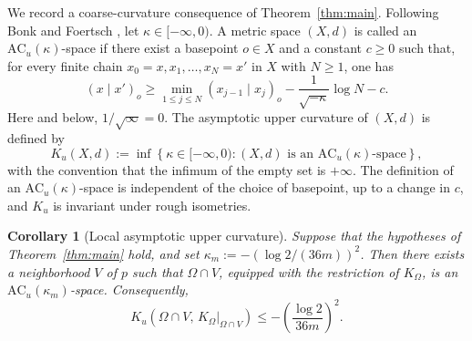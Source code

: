 \documentclass[11pt]{article}
\newtheorem{corollary}[theorem]{Corollary}
\theoremstyle{definition}
\begin{document}
We record a coarse-curvature consequence of
Theorem~\ref{thm:main}.  Following Bonk and Foertsch
\cite{BonkFoertsch}, let \(\kappa\in[-\infty,0)\).  A metric space
\((X,d)\) is called an \(\mathrm{AC}_u(\kappa)\)-space if there exist
a basepoint \(o\in X\) and a constant \(c\ge0\) such that, for every
finite chain \(x_0=x,x_1,\ldots,x_N=x'\) in \(X\) with \(N\ge1\), one has
\begin{equation}\label{eq:acu-chain-condition}
	(x\mid x')_o
	\ge
	\min_{1\le j\le N}(x_{j-1}\mid x_j)_o
	-
	\frac{1}{\sqrt{-\kappa}}\log N
	-c.
\end{equation}
Here and below, \(1/\sqrt{\infty}=0\).  The asymptotic upper curvature
of \((X,d)\) is defined by
\[
K_u(X,d)
:=
\inf\left\{
\kappa\in[-\infty,0):
(X,d)\text{ is an }\mathrm{AC}_u(\kappa)\text{-space}
\right\},
\]
with the convention that the infimum of the empty set is \(+\infty\).
The definition of an \(\mathrm{AC}_u(\kappa)\)-space is independent of
the choice of basepoint, up to a change in \(c\), and \(K_u\) is
invariant under rough isometries.

\begin{corollary}[Local asymptotic upper curvature]
	\label{cor:local-asymptotic-curvature}
	Suppose that the hypotheses of Theorem~\ref{thm:main} hold, and set
	\(\kappa_m:=-(\log 2/(36m))^2\).
	Then there exists a neighborhood \(V\) of \(p\) such that
	\(\Omega\cap V\), equipped with the restriction of \(K_\Omega\),
	is an \(\mathrm{AC}_u(\kappa_m)\)-space.  Consequently,
	\begin{equation*}
		K_u\left(
		\Omega\cap V,\,
		\left.K_\Omega\right|_{\Omega\cap V}
		\right)
		\le
		-\left(\frac{\log 2}{36m}\right)^2.
	\end{equation*}
\end{corollary}
\end{document}
